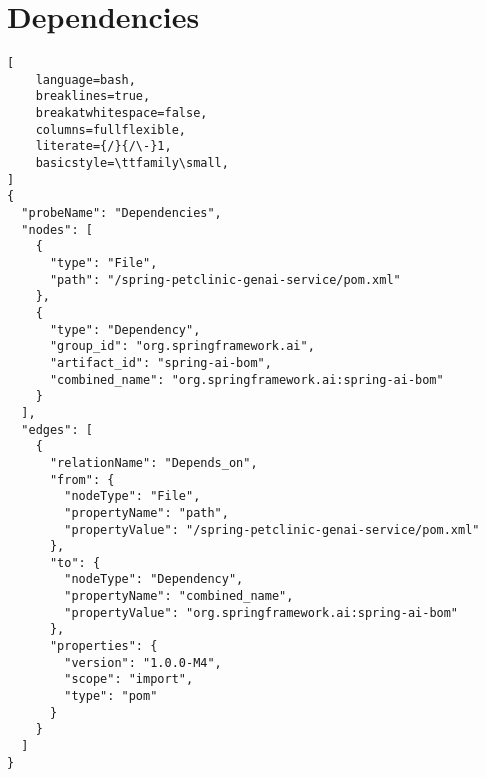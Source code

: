 \section{Dependencies}\label{appendix_sec:dependencies}
\begin{lstlisting}[
    language=bash,
    breaklines=true,
    breakatwhitespace=false,
    columns=fullflexible,
    literate={/}{/\-}1,
    basicstyle=\ttfamily\small,
]
{
  "probeName": "Dependencies",
  "nodes": [
    {
      "type": "File",
      "path": "/spring-petclinic-genai-service/pom.xml"
    },
    {
      "type": "Dependency",
      "group_id": "org.springframework.ai",
      "artifact_id": "spring-ai-bom",
      "combined_name": "org.springframework.ai:spring-ai-bom"
    }
  ],
  "edges": [
    {
      "relationName": "Depends_on",
      "from": {
        "nodeType": "File",
        "propertyName": "path",
        "propertyValue": "/spring-petclinic-genai-service/pom.xml"
      },
      "to": {
        "nodeType": "Dependency",
        "propertyName": "combined_name",
        "propertyValue": "org.springframework.ai:spring-ai-bom"
      },
      "properties": {
        "version": "1.0.0-M4",
        "scope": "import",
        "type": "pom"
      }
    }
  ]
}
\end{lstlisting}